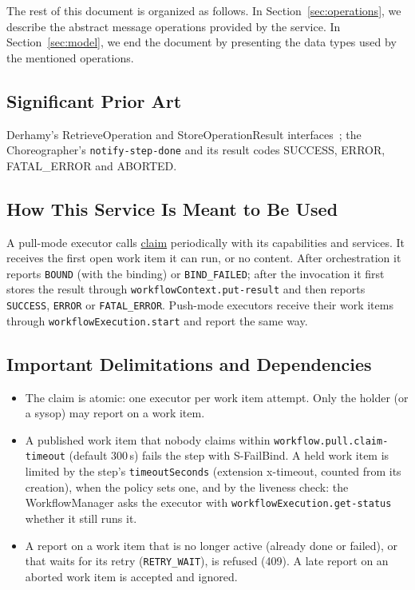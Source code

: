 \documentclass[a4paper]{arrowhead}
\newcommand{\oref}[1]{{\textcolor{ArrowheadBlue}{\hyperref[sec:operations:#1]{#1}}}}
\begin{document}
The rest of this document is organized as follows.
In Section~\ref{sec:operations}, we describe the abstract message operations provided by the service.
In Section~\ref{sec:model}, we end the document by presenting the data types used by the mentioned operations.

\subsection{Significant Prior Art}
Derhamy's RetrieveOperation and StoreOperationResult interfaces~\cite{derhamy2018workflow}; the
Choreographer's \texttt{notify-\allowbreak{}step-\allowbreak{}done} and its result codes SUCCESS, ERROR, FATAL\_ERROR and ABORTED.

\subsection{How This Service Is Meant to Be Used}
A pull-mode executor calls \oref{claim} periodically with its capabilities and services. It receives the
first open work item it can run, or no content. After orchestration it reports \texttt{BOUND} (with the binding) or
\texttt{BIND\_FAILED}; after the invocation it first stores the result through \texttt{workflow\allowbreak{}Context.\allowbreak{}put-\allowbreak{}result} and
then reports \texttt{SUCCESS}, \texttt{ERROR} or \texttt{FATAL\_ERROR}. Push-mode executors receive their work items
through \texttt{workflow\allowbreak{}Execution.\allowbreak{}start} and report the same way.

\subsection{Important Delimitations and Dependencies}
\label{sec:delimitations}
\begin{itemize}
\item The claim is atomic: one executor per work item attempt. Only the holder (or a sysop) may report on a work item.
\item A published work item that nobody claims within \texttt{workflow.\allowbreak{}pull.\allowbreak{}claim-\allowbreak{}timeout} (default 300\,s) fails the step with S-FailBind. A held work item is limited by the step's \texttt{timeout\allowbreak{}Seconds} (extension x-timeout, counted from its creation), when the policy sets one, and by the liveness check: the WorkflowManager asks the executor with \texttt{workflow\allowbreak{}Execution.\allowbreak{}get-\allowbreak{}status} whether it still runs it.
\item A report on a work item that is no longer active (already done or failed), or that waits for its retry (\texttt{RETRY\_WAIT}), is refused (409). A late report on an aborted work item is accepted and ignored.
\end{itemize}
\end{document}
